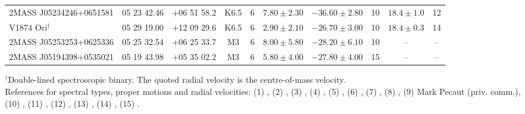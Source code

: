 \documentclass[usenatbib]{mnras}
\begin{document}
\begin{table*}
\begin{tabular}{l c c c c c c c c c}
2MASS J05234246+0651581   &   05 23 42.46              &   +06 51 58.2   &   K6.5              &   6   &   $7.80\pm2.30$                                            &   $-36.60\pm2.80$                 &   10        &   $18.4\pm1.0$                      &   12      \\
V1874 Ori$^{\dagger}$            &   05 29 19.00             &   +12 09 29.6   &   K6.5               &   6   &   $2.90\pm2.10$                                            &   $-26.70\pm3.00$                 &   10        &   $18.4\pm0.3$                      &   14    \\
2MASS J05253253+0625336   &   05 25 32.54             &   +06 25 33.7   &   M3                  &   6   &   $8.00\pm5.80$                                            &   $-28.20\pm6.10$                 &   10        &   --                                            &   --            \\
2MASS J05194398+0535021   &   05 19 43.98             &   +05 35 02.2   &   M3                  &   6   &   $5.80\pm4.00$                                            &   $-27.80\pm4.00$                 &   15      &   --                                            &   --           \\
\hline
\end{tabular}

\vspace{1pt}
\begin{flushleft}
%
$^{\dagger}$Double-lined spectroscopic binary. The quoted radial
velocity is the centre-of-mass velocity.\\
%
References for spectral types, proper motions and radial
  velocities: (1) \protect\cite{Edwards76}, (2)
\protect\cite{vanLeeuwen07}, (3) \protect\cite{Barbier-Brossat00}, (4)
\protect\cite{Abt95}, (5) \protect\cite*{Bobylev06}, (6) \protect\cite{Shvonski16},
(7) \protect\cite{Gaia16}, (8) \protect\cite{Gontcharov06},
(9) Mark Pecaut (priv. comm.), (10)
\protect\cite{Zacharias13}, (11) \protect\cite*{White07}, (12)
\protect\cite{Alcala00}, (13) \protect\cite{Elliott14}, (14)
\protect\cite{Mace09}, (15) \protect\cite{Roeser10}.
%
\end{flushleft}
\label{tab:bonafide_members}
\end{table*}
\end{document}

